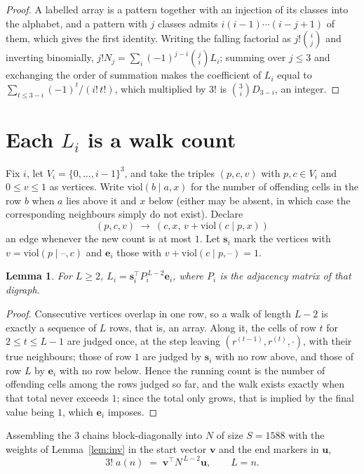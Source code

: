 \documentclass[11pt,a4paper]{article}
\theoremstyle{plain}
\newtheorem{lemma}[theorem]{Lemma}
\theoremstyle{definition}
\begin{document}
\begin{proof}
A labelled array is a pattern together with an injection of its classes into the alphabet,
and a pattern with $j$ classes admits $i(i-1)\cdots(i-j+1)$ of them, which gives the first
identity. Writing the falling factorial as $j!\binom{i}{j}$ and inverting binomially,
$j!N_j=\sum_i(-1)^{j-i}\binom{j}{i}L_i$; summing over $j\le3$ and exchanging the
order of summation makes the coefficient of $L_i$ equal to
$\sum_{t\le3-i}(-1)^t/(i!\,t!)$, which multiplied by $3!$ is
$\binom{3}{i}D_{3-i}$, an integer.
\end{proof}

\section{Each $L_i$ is a walk count}

Fix $i$, let $V_i=\{0,\dots,i-1\}^{3}$, and take the triples $(p,c,v)$ with
$p,c\in V_i$ and $0\le v\le1$ as vertices. Write $\mathrm{viol}(b\mid a,x)$ for the number
of offending cells in the row $b$ when $a$ lies above it and $x$ below (either may be
absent, in which case the corresponding neighbours simply do not exist). Declare
\[
(p,c,v)\ \longrightarrow\ (c,x,\,v+\mathrm{viol}(c\mid p,x))
\]
an edge whenever the new count is at most $1$. Let $\mathbf{s}_i$ mark the vertices with
$v=\mathrm{viol}(p\mid\text{--},c)$ and $\mathbf{e}_i$ those with
$v+\mathrm{viol}(c\mid p,\text{--})=1$.

\begin{lemma}\label{lem:walk}
For $L\ge2$, $L_i=\mathbf{s}_i^{\!\top}P_i^{\,L-2}\mathbf{e}_i$, where $P_i$ is the
adjacency matrix of that digraph.
\end{lemma}

\begin{proof}
Consecutive vertices overlap in one row, so a walk of length $L-2$ is exactly a sequence
of $L$ rows, that is, an array. Along it, the cells of row $t$ for $2\le t\le L-1$ are
judged once, at the step leaving $(r^{(t-1)},r^{(t)},\cdot)$, with their true neighbours;
those of row $1$ are judged by $\mathbf{s}_i$ with no row above, and those of row
$L$ by $\mathbf{e}_i$ with no row below. Hence the running count is the number of
offending cells among the rows judged so far, and the walk exists exactly when that total
never exceeds $1$; since the total only grows, that is implied by the final value being
$1$, which $\mathbf{e}_i$ imposes.
\end{proof}

Assembling the $3$ chains block-diagonally into $N$ of size $S=1588$ with the weights of
Lemma~\ref{lem:inv} in the start vector $\mathbf{v}$ and the end markers in
$\mathbf{u}$,
\begin{equation}\label{eq:walk2}
3!\;a(n)\;=\;\mathbf{v}^{\!\top}N^{\,L-2}\mathbf{u},\qquad L=n .
\end{equation}
\end{document}
